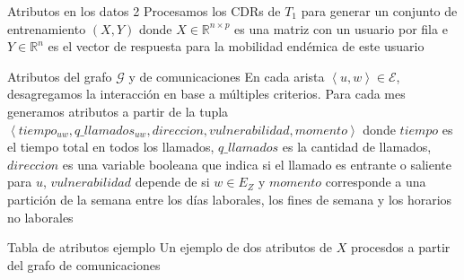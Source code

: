 \documentclass[xcolor=x11names]{beamer}
\def\calE{\mathcal{E}}
\def\calG{\mathcal{G}}
\begin{document}
\begin{frame}{Atributos en los datos 2}
	Procesamos los CDRs de $T_1$ para generar un conjunto de entrenamiento $(X,Y)$ donde $X \in \mathbb{R}^{n \times p}$ es una matriz con un usuario por fila e $Y \in \mathbb{R}^n$ es el vector de respuesta para la mobilidad endémica de este usuario

	\bigskip

	\begin{block}{Atributos del grafo $\calG$ y de comunicaciones}
		En cada arista $\left< u, w \right> \in \calE$, desagregamos la interacción en base a múltiples criterios. Para cada mes generamos atributos a partir de la tupla  $\left< tiempo_{uw}, q\_llamados_{uw}, direcci on, vulnerabilidad, momento \right>$ donde $tiempo$ es el tiempo total en todos los llamados, $q\_llamados$ es la cantidad de llamados, $direccion$ es una variable booleana que indica si el llamado es entrante o saliente para $u$, $vulnerabilidad$ depende de si $w \in E_Z$ y $momento$ corresponde a una partición de la semana entre los días laborales, los fines de semana y los horarios no laborales
	\end{block}

\end{frame}


\begin{frame}{Tabla de atributos ejemplo}
Un ejemplo de dos atributos de $X$ procesdos a partir del grafo de comunicaciones
	\begin{table}[ht]
		\label{tab:data_example}
		\footnotesize
		\centering
	\end{table}

\end{frame}
\end{document}
